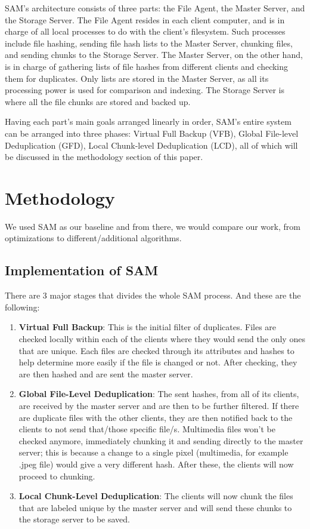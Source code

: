 \documentclass[journal]{IEEEtran}
\begin{document}
SAM’s architecture consists of three parts: the File Agent, the Master Server, and the Storage Server. The File Agent resides in each client computer, and is in charge of all local processes to do with the client’s filesystem. Such processes include file hashing, sending file hash lists to the Master Server, chunking files, and sending chunks to the Storage Server. The Master Server, on the other hand, is in charge of gathering lists of file hashes from different clients and checking them for duplicates. Only lists are stored in the Master Server, as all its processing power is used for comparison and indexing. The Storage Server is where all the file chunks are stored and backed up.

Having each part’s main goals arranged linearly in order, SAM’s entire system can be arranged into three phases: Virtual Full Backup (VFB), Global File-level Deduplication (GFD), Local Chunk-level Deduplication (LCD), all of which will be discussed in the methodology section of this paper.

\section{Methodology}

We used SAM as our baseline and from there, we would compare our work, from optimizations to different/additional algorithms.

\subsection{Implementation of SAM}

There are 3 major stages that divides the whole SAM process. And these are the following:

\begin{enumerate}
\item \textbf{Virtual Full Backup}: This is the initial filter of duplicates. Files are checked locally within each of the clients where they would send the only ones that are unique. Each files are checked through its attributes and hashes to help determine more easily if the file is changed or not.
After checking, they are then hashed and are sent the master server.
\item \textbf{Global File-Level Deduplication}: The sent hashes, from all of its clients, are received by the master server and are then to be further filtered. If there are duplicate files with the other clients, they are then notified back to the clients to not send that/those specific file/s. Multimedia files won’t be checked anymore, immediately chunking it and sending directly to the master server; this is because a change to a single pixel (multimedia, for example .jpeg file) would give a very different hash. After these, the clients will now proceed to chunking.
\item \textbf{Local Chunk-Level Deduplication}: The clients will now chunk the files that are labeled unique by the master server and will send these chunks to the storage server to be saved.
\end{enumerate}
\end{document}
